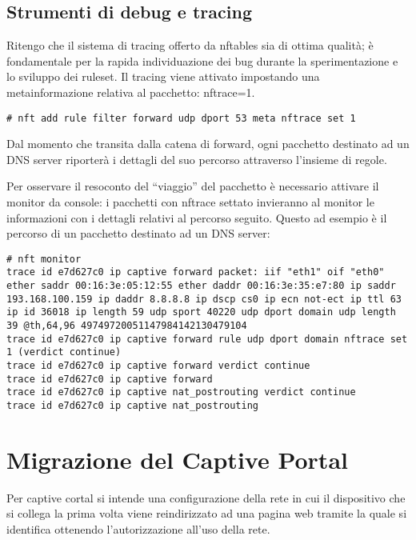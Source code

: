 \section{Strumenti di debug e tracing}
Ritengo che il sistema di tracing offerto da nftables sia di ottima qualit\`a;
\`e fondamentale per la rapida individuazione dei bug durante la
sperimentazione e lo sviluppo dei ruleset.
Il tracing viene attivato impostando una metainformazione relativa al pacchetto: nftrace=1.
\begin{lstlisting}
# nft add rule filter forward udp dport 53 meta nftrace set 1
\end{lstlisting}
Dal momento che transita dalla catena di forward, ogni pacchetto destinato ad un DNS server riporter\`a
i dettagli del suo percorso attraverso l'insieme di regole.

Per osservare il resoconto del ``viaggio'' del pacchetto \`e necessario attivare il
monitor da console: i pacchetti con nftrace settato invieranno al monitor le informazioni
con i dettagli relativi al percorso seguito.
Questo ad esempio \`e il percorso di un pacchetto destinato ad un DNS server:
\begin{lstlisting}[style=customc]
# nft monitor
trace id e7d627c0 ip captive forward packet: iif "eth1" oif "eth0" ether saddr 00:16:3e:05:12:55 ether daddr 00:16:3e:35:e7:80 ip saddr 193.168.100.159 ip daddr 8.8.8.8 ip dscp cs0 ip ecn not-ect ip ttl 63 ip id 36018 ip length 59 udp sport 40220 udp dport domain udp length 39 @th,64,96 49749720051147984142130479104
trace id e7d627c0 ip captive forward rule udp dport domain nftrace set 1 (verdict continue)
trace id e7d627c0 ip captive forward verdict continue
trace id e7d627c0 ip captive forward
trace id e7d627c0 ip captive nat_postrouting verdict continue
trace id e7d627c0 ip captive nat_postrouting
\end{lstlisting}

\chapter{Migrazione del Captive Portal}


Per captive cortal si intende una configurazione della rete in cui il
dispositivo che si collega la prima volta viene reindirizzato ad una pagina web
tramite la quale si identifica ottenendo l'autorizzazione all'uso della rete.

